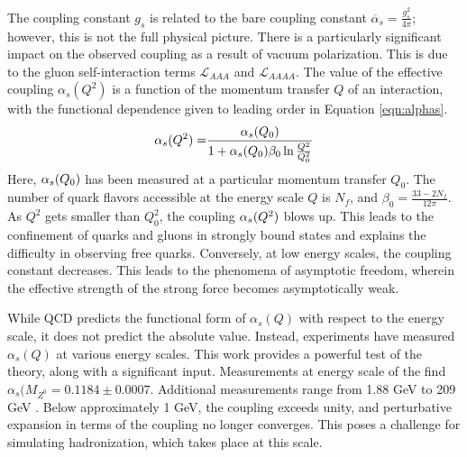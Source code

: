 The coupling constant $g_s$ is related to the bare coupling constant $\overline{\alpha}_s=\frac{g^2_s}{4\pi}$; however, this is not the full physical picture.
There is a particularly significant impact on the observed coupling as a result of vacuum polarization.
This is due to the gluon self-interaction terms $\mathcal{L}_{AAA}$ and $\mathcal{L}_{AAAA}$.
The value of the effective coupling $\alpha_s(Q^2)$ is a function of the momentum transfer $Q$ of an interaction, with the functional dependence given to leading order in Equation \ref{eqn:alphas}.
\begin{equation}\begin{split}\label{eqn:alphas}
    \alpha_s(Q^2)=&\frac{\alpha_s(Q_0)}{1+\alpha_s(Q_0)\beta_0\ln\frac{Q^2}{Q_0^2}} \\
\end{split}\end{equation}
Here, $\alpha_s(Q_0)$ has been measured at a particular momentum transfer $Q_0$.
The number of quark flavors accessible at the energy scale $Q$ is $N_f$, and $\beta_0=\frac{33-2N_f}{12\pi}$.
As $Q^2$ gets smaller than $Q_0^2$, the coupling $\alpha_s(Q^2)$ blows up.
This leads to the confinement of quarks and gluons in strongly bound states and explains the difficulty in observing free quarks.
Conversely, at low energy scales, the coupling constant decreases.
This leads to the phenomena of asymptotic freedom, wherein the effective strength of the strong force becomes asymptotically weak.

While QCD predicts the functional form of $\alpha_s(Q)$ with respect to the energy scale, it does not predict the absolute value.
Instead, experiments have measured $\alpha_s(Q)$ at various energy scales.
This work provides a powerful test of the theory, along with a significant input.
Measurements at energy scale of the \Z find $\alpha_s(M_{Z^0}=0.1184\pm0.0007$.
Additional measurements range from 1.88 GeV to 209 GeV \cite{bethke}.
Below approximately 1 GeV, the coupling exceeds unity, and perturbative expansion in terms of the coupling no longer converges.
This poses a challenge for simulating hadronization, which takes place at this scale.

